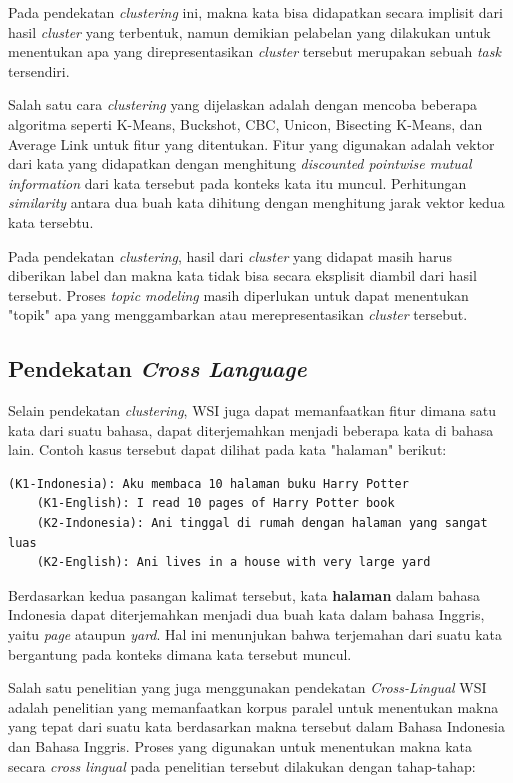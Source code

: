 	Pada pendekatan \textit{clustering} ini, makna kata bisa didapatkan secara implisit dari hasil \textit{cluster} yang terbentuk, namun demikian pelabelan yang dilakukan untuk menentukan apa yang direpresentasikan \textit{cluster} tersebut merupakan sebuah \textit{task} tersendiri.
	
	Salah satu cara \textit{clustering} yang dijelaskan \citep{pantel2002discovering} adalah dengan mencoba beberapa algoritma seperti K-Means, Buckshot, CBC, Unicon, Bisecting K-Means, dan Average Link untuk fitur yang ditentukan. Fitur yang digunakan adalah vektor dari kata yang didapatkan dengan menghitung \textit{discounted pointwise mutual information} dari kata tersebut pada konteks kata itu muncul. Perhitungan \textit{similarity} antara dua buah kata dihitung dengan menghitung jarak vektor kedua kata tersebtu.
	
	Pada pendekatan \textit{clustering}, hasil dari \textit{cluster} yang didapat masih harus diberikan label dan makna kata tidak bisa secara eksplisit diambil dari hasil tersebut. Proses \textit{topic modeling} masih diperlukan untuk dapat menentukan "topik" apa yang menggambarkan atau merepresentasikan \textit{cluster} tersebut. 
	
	\subsection{Pendekatan \textit{Cross Language}}
	Selain pendekatan \textit{clustering}, WSI juga dapat memanfaatkan fitur dimana satu kata dari suatu bahasa, dapat diterjemahkan menjadi beberapa kata di bahasa lain. Contoh kasus tersebut dapat dilihat pada kata "halaman" berikut:

	\begin{lstlisting}[backgroundcolor = \color{white}]
	(K1-Indonesia): Aku membaca 10 halaman buku Harry Potter
	(K1-English): I read 10 pages of Harry Potter book
	(K2-Indonesia): Ani tinggal di rumah dengan halaman yang sangat luas
	(K2-English): Ani lives in a house with very large yard
	\end{lstlisting}
	
	Berdasarkan kedua pasangan kalimat tersebut, kata \textbf{halaman} dalam bahasa Indonesia dapat diterjemahkan menjadi dua buah kata dalam bahasa Inggris, yaitu \textit{page} ataupun \textit{yard}. Hal ini menunjukan bahwa terjemahan dari suatu kata bergantung pada konteks dimana kata tersebut muncul.
	
	Salah satu penelitian yang juga menggunakan pendekatan \textit{Cross-Lingual} WSI adalah penelitian \citep{septiantri2013wsd} yang memanfaatkan korpus paralel untuk menentukan makna yang tepat dari suatu kata berdasarkan makna tersebut dalam Bahasa Indonesia dan Bahasa Inggris. Proses yang digunakan untuk menentukan makna kata secara \textit{cross lingual} pada penelitian tersebut dilakukan dengan tahap-tahap:
	
